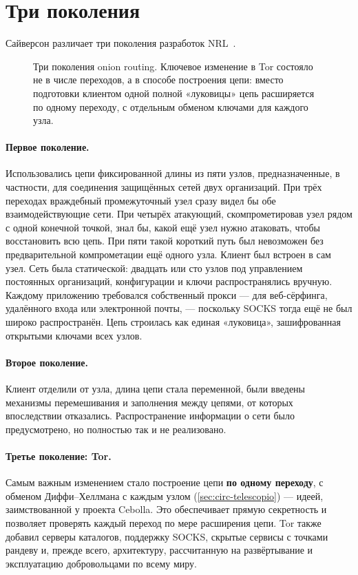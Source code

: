 \section{Три поколения}\label{sec:nascita-generazioni}

Сайверсон различает три поколения разработок NRL~\cite{syverson2011peel}.

\begin{figure}[htbp]
\centering

\caption{Три поколения onion routing. Ключевое изменение в Tor состояло не в числе переходов, а в способе построения цепи: вместо подготовки клиентом одной полной «луковицы» цепь расширяется по одному переходу, с отдельным обменом ключами для каждого узла.}
\label{fig:generazioni}
\end{figure}

\paragraph{Первое поколение.} Использовались цепи фиксированной длины из пяти узлов, предназначенные, в частности, для соединения защищённых сетей двух организаций. При трёх переходах враждебный промежуточный узел сразу видел бы обе взаимодействующие сети. При четырёх атакующий, скомпрометировав узел рядом с одной конечной точкой, знал бы, какой ещё узел нужно атаковать, чтобы восстановить всю цепь. При пяти такой короткий путь был невозможен без предварительной компрометации ещё одного узла. Клиент был встроен в сам узел. Сеть была статической: двадцать или сто узлов под управлением постоянных организаций, конфигурации и ключи распространялись вручную. Каждому приложению требовался собственный прокси --- для веб-сёрфинга, удалённого входа или электронной почты, --- поскольку SOCKS тогда ещё не был широко распространён. Цепь строилась как единая «луковица», зашифрованная открытыми ключами всех узлов.

\paragraph{Второе поколение.} Клиент отделили от узла, длина цепи стала переменной, были введены механизмы перемешивания и заполнения между цепями, от которых впоследствии отказались. Распространение информации о сети было предусмотрено, но полностью так и не реализовано.

\paragraph{Третье поколение: Tor.} Самым важным изменением стало построение цепи \textbf{по одному переходу}, с обменом Диффи--Хеллмана с каждым узлом (\cref{sec:circ-telescopio}) --- идеей, заимствованной у проекта Cebolla. Это обеспечивает прямую секретность и позволяет проверять каждый переход по мере расширения цепи. Tor также добавил серверы каталогов, поддержку SOCKS, скрытые сервисы с точками рандеву и, прежде всего, архитектуру, рассчитанную на развёртывание и эксплуатацию добровольцами по всему миру.

